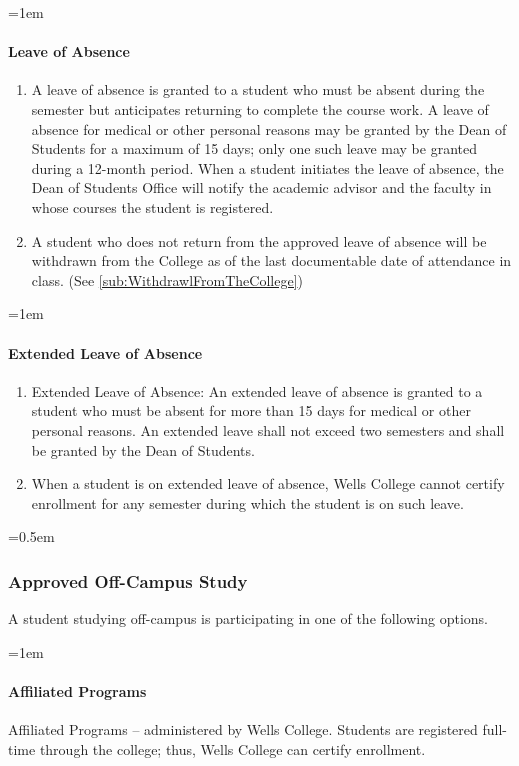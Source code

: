 \documentclass{manual}
\newcommand{\modified}[1]{}
\newcommand{\oldbreak}[1]{}
\let\oldsubsubsection\subsubsection
\renewcommand\subsubsection{\leftskip=0.5em\oldsubsubsection}
\let\oldparagraph\paragraph
\renewcommand\paragraph{\leftskip=1em\oldparagraph}
\begin{document}
\paragraph{Leave of Absence} \modified{5/9/95}

\begin{enumerate}[label=\alph*)]
\item A leave of absence is granted to a student who must be absent during the semester but anticipates returning to complete the course work. A leave of absence for medical or other personal reasons may be granted by the Dean of Students for a maximum of 15 days; only one such leave may be granted during a 12-month period. When a student initiates the leave of absence, the Dean of Students Office will notify the academic advisor and the faculty in whose courses the student is registered.
\item A student who does not return from the approved leave of absence will be withdrawn from the College as of the last documentable date of attendance in class. (See \cref{sub:WithdrawlFromTheCollege})
\end{enumerate}

\oldbreak{IX-1}

\paragraph{Extended Leave of Absence}

\begin{enumerate}[label=\alph*)]
\item Extended Leave of Absence: An extended leave of absence is granted to a student who must be absent for more than 15 days for medical or other personal reasons. An extended leave shall not exceed two semesters and shall be granted by the Dean of Students. 
\item When a student is on extended leave of absence, Wells College cannot certify enrollment for  any semester during which the student is on such leave.
\end{enumerate}

\subsubsection{Approved Off-Campus Study}

A student studying off-campus is participating in one of the following options.

\paragraph{Affiliated Programs}
Affiliated Programs -- administered by Wells College. Students are registered full-time through the college; thus, Wells College can certify enrollment.
\end{document}
